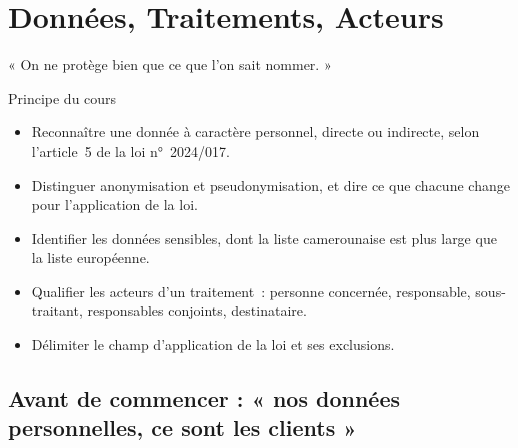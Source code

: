 
\chapter{Données, Traitements, Acteurs}
\label{chap:donnees}

\epigraph{%
    « On ne protège bien que ce que l'on sait nommer. »%
}{Principe du cours}


\begin{boxobjectifs}
\begin{itemize}
    \item Reconnaître une donnée à caractère personnel, directe ou
          indirecte, selon l'article~5 de la loi n°~2024/017.
    \item Distinguer anonymisation et pseudonymisation, et dire ce que
          chacune change pour l'application de la loi.
    \item Identifier les données sensibles, dont la liste camerounaise est
          plus large que la liste européenne.
    \item Qualifier les acteurs d'un traitement~: personne concernée,
          responsable, sous-traitant, responsables conjoints, destinataire.
    \item Délimiter le champ d'application de la loi et ses exclusions.
\end{itemize}
\end{boxobjectifs}

\bigskip

\section*{Avant de commencer : « nos données personnelles, ce sont les clients »}

